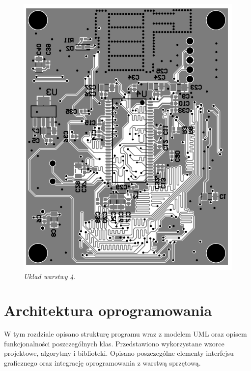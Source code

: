 \documentclass[eng,printmode]{mgr}
\begin{document}
\begin{center}\centering
\vspace*{\fill}
\begin{figure}[!h]
    \centering
    \includegraphics[width=\textwidth]{pcb/bottom.png}
    \caption{\textit{\scriptsize Układ warstwy 4.}}
\end{figure}
\vfill
\end{center}
\newpage

\chapter{ Architektura oprogramowania}

W tym rozdziale opisano strukturę programu wraz z modelem UML oraz opisem funkcjonalności poszczególnych klas. Przedstawiono wykorzystane wzorce projektowe, algorytmy i biblioteki. Opisano poszczególne elementy interfejsu graficznego oraz integrację oprogramowania z warstwą sprzętową.
\end{document}
